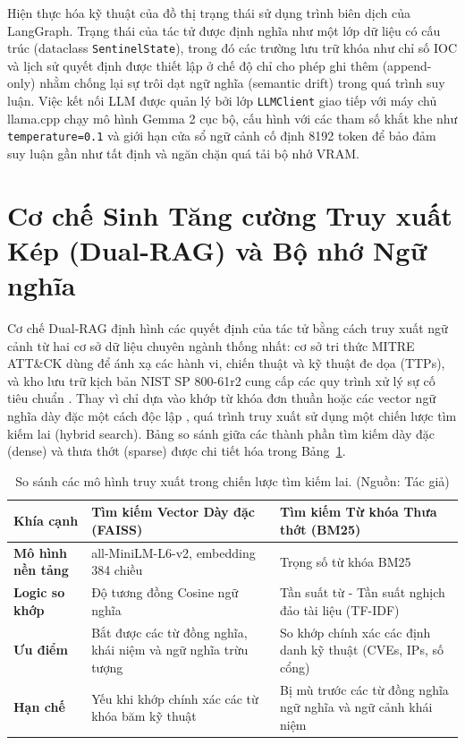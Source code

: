 Hiện thực hóa kỹ thuật của đồ thị trạng thái sử dụng trình biên dịch của LangGraph. Trạng thái của tác tử được định nghĩa như một lớp dữ liệu có cấu trúc (dataclass \texttt{SentinelState}), trong đó các trường lưu trữ khóa như chỉ số IOC và lịch sử quyết định được thiết lập ở chế độ chỉ cho phép ghi thêm (append-only) nhằm chống lại sự trôi dạt ngữ nghĩa (semantic drift) trong quá trình suy luận. Việc kết nối LLM được quản lý bởi lớp \texttt{LLMClient} giao tiếp với máy chủ llama.cpp chạy mô hình Gemma 2 \cite{gemma_2_2024} cục bộ, cấu hình với các tham số khắt khe như \texttt{temperature=0.1} và giới hạn cửa sổ ngữ cảnh cố định 8192 token để bảo đảm suy luận gần như tất định và ngăn chặn quá tải bộ nhớ VRAM.

\section{Cơ chế Sinh Tăng cường Truy xuất Kép (Dual-RAG) và Bộ nhớ Ngữ nghĩa}

Cơ chế Dual-RAG định hình các quyết định của tác tử bằng cách truy xuất ngữ cảnh từ hai cơ sở dữ liệu chuyên ngành thống nhất: cơ sở tri thức MITRE ATT\&CK \cite{strom2018mitre} dùng để ánh xạ các hành vi, chiến thuật và kỹ thuật đe dọa (TTPs), và kho lưu trữ kịch bản NIST SP 800-61r2 cung cấp các quy trình xử lý sự cố tiêu chuẩn \cite{nist80061}. Thay vì chỉ dựa vào khớp từ khóa đơn thuần hoặc các vector ngữ nghĩa dày đặc một cách độc lập \cite{rag2020}, quá trình truy xuất sử dụng một chiến lược tìm kiếm lai (hybrid search). Bảng so sánh giữa các thành phần tìm kiếm dày đặc (dense) và thưa thớt (sparse) được chi tiết hóa trong Bảng~\ref{tab:search_comparison}.

\begin{table}[!htbp]
    \centering
    \caption{So sánh các mô hình truy xuất trong chiến lược tìm kiếm lai. (Nguồn: Tác giả)}
    \label{tab:search_comparison}
    \begin{tabular}{|>{\raggedright\arraybackslash}p{}|>{\raggedright\arraybackslash}p{}|>{\raggedright\arraybackslash}p{}|}
        \hline
        \textbf{Khía cạnh} & \textbf{Tìm kiếm Vector Dày đặc (FAISS)} & \textbf{Tìm kiếm Từ khóa Thưa thớt (BM25)} \\
        \hline
        \textbf{Mô hình nền tảng} & all-MiniLM-L6-v2, embedding 384 chiều \cite{reimers2019sentence} & Trọng số từ khóa BM25 \\
        \hline
        \textbf{Logic so khớp} & Độ tương đồng Cosine ngữ nghĩa \cite{faiss2019} & Tần suất từ - Tần suất nghịch đảo tài liệu (TF-IDF) \cite{bm25_2009} \\
        \hline
        \textbf{Ưu điểm} & Bắt được các từ đồng nghĩa, khái niệm và ngữ nghĩa trừu tượng & So khớp chính xác các định danh kỹ thuật (CVEs, IPs, số cổng) \\
        \hline
        \textbf{Hạn chế} & Yếu khi khớp chính xác các từ khóa băm kỹ thuật & Bị mù trước các từ đồng nghĩa ngữ nghĩa và ngữ cảnh khái niệm \\
        \hline
    \end{tabular}
\end{table}


